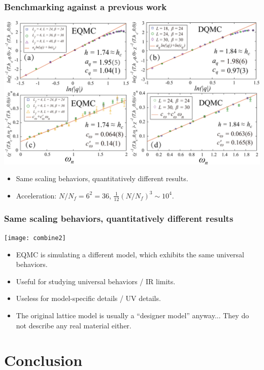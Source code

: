 \documentclass[xcolor=table, 10pt, aspectratio=43]{beamer}
\begin{document}
\begin{frame}
  \frametitle{Benchmarking against a previous work}
  \begin{center}
    \includegraphics[width=\textwidth]{chiwqanalysis.pdf}
  \end{center}
\begin{itemize}
  \item Same scaling behaviors, quantitatively different results.
  \item Acceleration: $N/N_f=6^2=36$, $\frac1{12}(N/N_f)^3 \sim 10^4$.
\end{itemize}
\end{frame}

\begin{frame}
  \frametitle{Same scaling behaviors, quantitatively different results}
  \begin{center}
    \texttt{[image: combine2]}
  \end{center}
  \begin{itemize}
    \item EQMC is simulating a \alert{different} model, which exhibits the same universal behaviors.
		\item Useful for studying universal behaviors / IR limits.
		\item Useless for model-specific details / UV details.
		\item The original lattice model is usually a ``designer model'' anyway... They do not describe any real material either.
  \end{itemize}
\end{frame}

\section{Conclusion}
\end{document}
